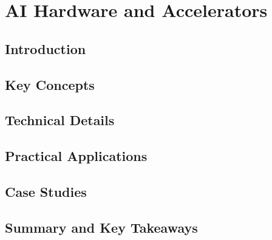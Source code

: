 ﻿%

\chapter{AI Hardware and Accelerators}
\label{ch:chapter-14}

\section{Introduction}


\section{Key Concepts}


\section{Technical Details}


\section{Practical Applications}


\section{Case Studies}


\section{Summary and Key Takeaways}


